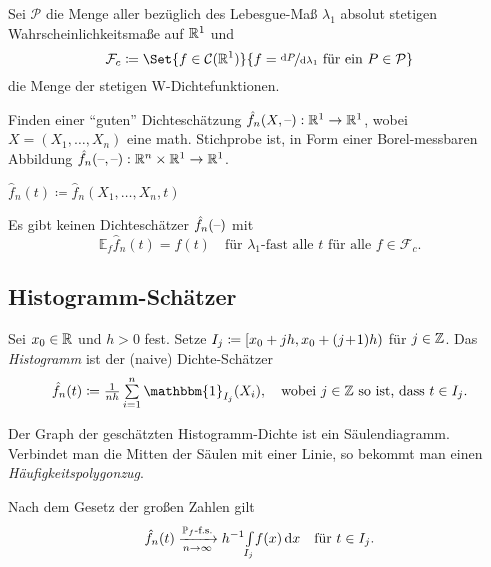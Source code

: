 \documentclass{cheat-sheet}
\renewcommand{\P}{\mathbb{P}} %
\newcommand{\E}{\mathbb{E}} %
\newcommand{\ind}{\mathbbm{1}} %
\newcommand{\Cont}{\mathcal{C}} %
\begin{document}

\begin{nota}
  Sei $\mathcal{P}$ die Menge aller bezüglich des Lebesgue-Maß $\lambda_1$ absolut stetigen Wahrscheinlichkeitsmaße auf $\mathbb{R}^1$ und
  \[ \mathcal{F}_c \coloneqq \Set{f \in \Cont(\R^1)}{f = \nicefrac{\d P}{\d \lambda_1} \text{ für ein } P \in \mathcal{P}} \]
  die Menge der stetigen W-Dichtefunktionen.
\end{nota}

\begin{ziel}
  Finden einer "`guten"' Dichteschätzung $\hat{f}_n(X, \text{--}) : \mathbb{R}^1 \to \mathbb{R}^1$, wobei $X = (X_1, \ldots, X_n)$ eine math. Stichprobe ist, in Form einer Borel-messbaren Abbildung $\hat{f}_n(\text{--}, \text{--}) : \mathbb{R}^n \times \mathbb{R}^1 \to \mathbb{R}^1$.
\end{ziel}

\begin{nota}
  $\hat{f}_n(t) \coloneqq \hat{f}_n(X_1, \ldots, X_n, t)$
\end{nota}

\begin{lem}
  Es gibt keinen Dichteschätzer $\hat{f}_n(\text{--})$ mit
  \[
    \E_f \hat{f}_n(t) = f(t) \quad
    \text{für $\lambda_1$-fast alle $t$ für alle $f \in \mathcal{F}_c$.}
  \]
\end{lem}

\subsection{Histogramm-Schätzer}

\begin{defn}
  Sei $x_0 \in \mathbb{R}$ und $h > 0$ fest.
  Setze $I_j \coloneqq \left[ x_0 + jh, x_0 + (j\!+\!1) h \right)$ für $j \in \mathbb{Z}$.
  Das \emph{Histogramm} ist der (naive) Dichte-Schätzer
  \[
    \hat{f}_n(t) \coloneqq \tfrac{1}{nh} \sum_{i=1}^n \ind_{I_j}(X_i), \quad
    \text{wobei $j \in \Z$ so ist, dass $t \in I_j$}.
  \]
\end{defn}

\begin{bem}
  Der Graph der geschätzten Histogramm-Dichte ist ein Säulendiagramm.
  Verbindet man die Mitten der Säulen mit einer Linie, so bekommt man einen \emph{Häufigkeitspolygonzug}.
\end{bem}

\begin{bem}
  Nach dem Gesetz der großen Zahlen gilt
  \[
    \hat{f}_n(t) \xra[n \to \infty]{\text{$\P_f$-f.s.}}
    h^{-1} \Int{I_j}{}{f(x)}{x} \quad
    \text{für $t \in I_j$.}
  \]
\end{bem}
\end{document}
